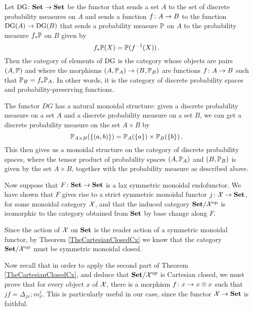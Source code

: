 \documentclass{article}
\begin{document}
\begin{example}
  Let $\operatorname{DG} \colon {\normalfont\textbf{Set}} \to {\normalfont\textbf{Set}}$ be the functor that sends a set $A$ to the set of discrete probability measures on $A$ and sends a function $f\colon A \to B$ to the function $\operatorname{DG}(A) \to \operatorname{DG}(B)$ that sends a probability measure $\mathbb{P}$ on $A$ to the probability measure $f_*\mathbb{P}$ on $B$ given by
  \[
    f_*\mathbb{P}(X) = \mathbb{P}(f^{-1}(X))\,.
    \]
  Then the category of elements of $\operatorname{DG}$ is the category whose objects are pairs $(A,\mathbb{P})$ and where the morphisms $(A,\mathbb{P}_A) \to (B,\mathbb{P}_B)$ are functions $f\colon A \to B$ such that $\mathbb{P}_B=f_*\mathbb{P}_A$.  
  In other words, it is the category of discrete probability spaces and probability-preserving functions.

  The functor $DG$ has a natural monoidal structure: given a discrete probability measure on a set $A$ and a discrete probability measure on a set $B$, we can get a discrete probability measure on the set $A \times B$ by
  \[
    \mathbb{P}_{A\times B}(\{(a,b)\}) = \mathbb{P}_A(\{a\})\times\mathbb{P}_B(\{b\})\,.
    \]
  This then gives us a monoidal structure on the category of discrete probability spaces, where the tensor product of probability spaces $(A,\mathbb{P}_A)$ and $(B,\mathbb{P}_B)$ is given by the set $A \times B$, together with the probability measure as described above.
\end{example}

Now suppose that $F\colon {\normalfont\textbf{Set}} \to {\normalfont\textbf{Set}}$ is a lax symmetric monoidal endofunctor.  
We have shown that $F$ gives rise to a strict symmetric monoidal functor $j\colon \mathcal X \to {\normalfont\textbf{Set}}$, for some monoidal category $\mathcal X$, and that the induced category ${\normalfont\textbf{Set}}/\mathcal X^{\mathrm{op}}$ is isomorphic to the category obtained from ${\normalfont\textbf{Set}}$ by base change along $F$.  

Since the action of $\mathcal X$ on ${\normalfont\textbf{Set}}$ is the reader action of a symmetric monoidal functor, by Theorem \ref{TheCartesianClosedCx} we know that the category ${\normalfont\textbf{Set}}/\mathcal X^{\mathrm{op}}$ must be symmetric monoidal closed.  

Now recall that in order to apply the second part of Theorem \ref{TheCartesianClosedCx}, and deduce that ${\normalfont\textbf{Set}}/\mathcal X^{\mathrm{op}}$ is Cartesian closed, we must prove that for every object $x$ of $\mathcal X$, there is a morphism $f \colon x \to x \otimes x$ such that $jf = \Delta_{jx};m^j_x$.  
This is particularly useful in our case, since the functor $\mathcal X \to {\normalfont\textbf{Set}}$ is faithful.
\end{document}
